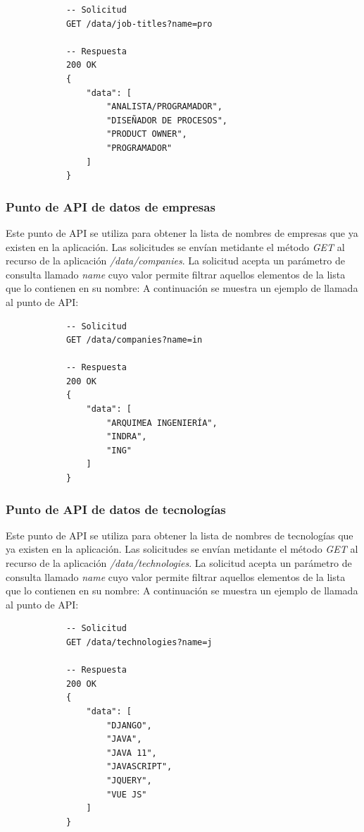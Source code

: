 \documentclass[a4paper, 12pt]{book}
\begin{document}
			{\footnotesize
			\begin{verbatim}
			-- Solicitud
			GET /data/job-titles?name=pro

			-- Respuesta
			200 OK
			{
			    "data": [
			        "ANALISTA/PROGRAMADOR",
			        "DISEÑADOR DE PROCESOS",
			        "PRODUCT OWNER",
			        "PROGRAMADOR"
			    ]
			}
			\end{verbatim}
			}

\subsubsection{Punto de API de datos de empresas}
\label{subsec:get_data_companies}
Este punto de API se utiliza para obtener la lista de nombres de empresas que ya existen en la aplicación.
Las solicitudes se envían metidante el método \emph{GET} al recurso de la aplicación \emph{/data/companies}.
La solicitud acepta un parámetro de consulta llamado \emph{name} cuyo valor permite filtrar aquellos elementos de la lista que lo contienen en su nombre:
A continuación se muestra un ejemplo de llamada al punto de API:

			{\footnotesize
			\begin{verbatim}
			-- Solicitud
			GET /data/companies?name=in

			-- Respuesta
			200 OK
			{
			    "data": [
			        "ARQUIMEA INGENIERÍA",
			        "INDRA",
			        "ING"
			    ]
			}
			\end{verbatim}
			}

\subsubsection{Punto de API de datos de tecnologías}
\label{subsec:get_data_job_technologies}
Este punto de API se utiliza para obtener la lista de nombres de tecnologías que ya existen en la aplicación.
Las solicitudes se envían metidante el método \emph{GET} al recurso de la aplicación \emph{/data/technologies}.
La solicitud acepta un parámetro de consulta llamado \emph{name} cuyo valor permite filtrar aquellos elementos de la lista que lo contienen en su nombre:
A continuación se muestra un ejemplo de llamada al punto de API:

			{\footnotesize
			\begin{verbatim}
			-- Solicitud
			GET /data/technologies?name=j

			-- Respuesta
			200 OK
			{
			    "data": [
			        "DJANGO",
			        "JAVA",
			        "JAVA 11",
			        "JAVASCRIPT",
			        "JQUERY",
			        "VUE JS"
			    ]
			}
			\end{verbatim}
			}
\end{document}
